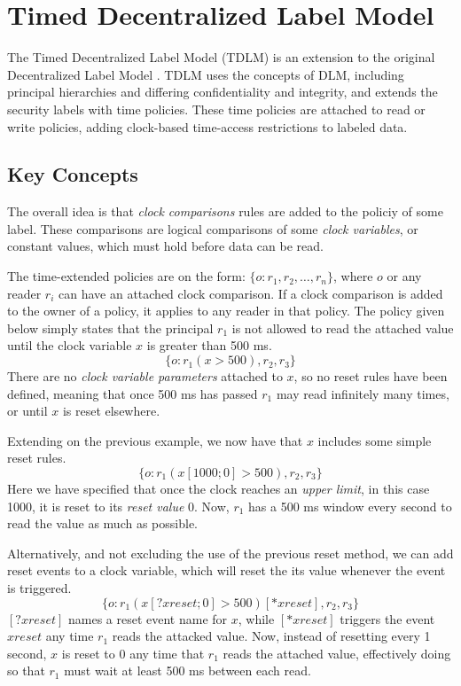 
\newcommand{\tat}{\;@\;} %
\newcommand{\tdor}{\;||\;} %

\section{Timed Decentralized Label Model}
The Timed Decentralized Label Model (TDLM) is an extension to the original Decentralized Label Model \cite{pedersen2015}.
TDLM uses the concepts of DLM, including principal hierarchies and differing confidentiality and integrity, and extends the security labels with time policies.
These time policies are attached to read or write policies, adding clock-based time-access restrictions to labeled data.

\subsection{Key Concepts}
The overall idea is that \emph{clock comparisons} rules are added to the policiy of some label.
These comparisons are logical comparisons of some \emph{clock variables}, or constant values, which must hold before data can be read.

The time-extended policies are on the form: $\{ o: r_1, r_2, \dots, r_n \}$, where $o$ or any reader $r_i$ can have an attached clock comparison.
If a clock comparison is added to the owner of a policy, it applies to any reader in that policy.
The policy given below simply states that the principal $r_1$ is not allowed to read the attached value until the clock variable $x$ is greater than 500 ms.
  \[ \{ o : r_1(x > 500), r_2, r_3 \} \]
There are no \emph{clock variable parameters} attached to $x$, so no reset rules have been defined, meaning that once 500 ms has passed $r_1$ may read infinitely many times, or until $x$ is reset elsewhere.

Extending on the previous example, we now have that $x$ includes some simple reset rules.
  \[ \{ o : r_1(x[1000;0] > 500), r_2, r_3 \} \]
Here we have specified that once the clock reaches an \emph{upper limit}, in this case 1000, it is reset to its \emph{reset value} 0.
Now, $r_1$ has a 500 ms window every second to read the value as much as possible.

Alternatively, and not excluding the use of the previous reset method, we can add reset events to a clock variable, which will reset the its value whenever the event is triggered.
  \[ \{ o : r_1(x[?xreset;0] > 500)[*xreset], r_2, r_3 \} \]
$[?xreset]$ names a reset event name for $x$, while $[*xreset]$ triggers the event $xreset$ any time $r_1$ reads the attacked value.
Now, instead of resetting every 1 second, $x$ is reset to 0 any time that $r_1$ reads the attached value, effectively doing so that $r_1$ must wait at least 500 ms between each read.

